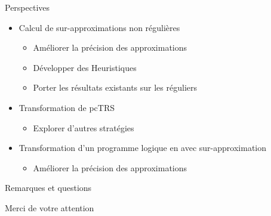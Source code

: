 \documentclass[xcolor={dvipsnames}]{beamer}
\begin{document}
\begin{frame}{Perspectives}
  \begin{itemize}[<+->]
  \item Calcul de sur-approximations non régulières
    \begin{itemize}
    \item Améliorer la précision des approximations
    \item Développer des Heuristiques
    \item Porter les résultats existants sur les réguliers
    \end{itemize}
  \item Transformation de pcTRS
    \begin{itemize}
      \item Explorer d'autres stratégies
    \end{itemize}
  \item Transformation d'un programme logique en \csprogramme avec sur-approximation
    \begin{itemize}
    \item Améliorer la précision des approximations
    \end{itemize}
  \end{itemize}
\end{frame}

\begin{frame}{Remarques et questions}
  \begin{center}
    Merci de votre attention
  \end{center}
\end{frame}
\end{document}
